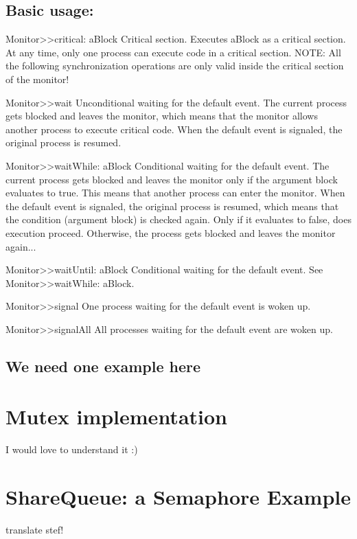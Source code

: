 \documentclass[10pt,twoside,english]{_support/latex/sbabook/sbabook}
\begin{document}
\section{Basic usage:}
Monitor\textgreater{}\textgreater{}critical: aBlock
Critical section.
Executes aBlock as a critical section. At any time, only one process can execute code in a critical section.
NOTE: All the following synchronization operations are only valid inside the critical section of the monitor!

Monitor\textgreater{}\textgreater{}wait
Unconditional waiting for the default event.
The current process gets blocked and leaves the monitor, which means that the monitor allows another process to execute critical code. When the default event is signaled, the original process is resumed.

Monitor\textgreater{}\textgreater{}waitWhile: aBlock
Conditional waiting for the default event.
The current process gets blocked and leaves the monitor only if the argument block evaluates to true. This means that another process can enter the monitor. When the default event is signaled, the original process is resumed, which means that the condition (argument block) is checked again. Only if it evaluates to false, does execution proceed. Otherwise, the process gets blocked and leaves the monitor again...

Monitor\textgreater{}\textgreater{}waitUntil: aBlock
Conditional waiting for the default event.
See Monitor\textgreater{}\textgreater{}waitWhile: aBlock.

Monitor\textgreater{}\textgreater{}signal
One process waiting for the default event is woken up.

Monitor\textgreater{}\textgreater{}signalAll
All processes waiting for the default event are woken up.
\section{We need one example here}\chapter{Mutex implementation}
I would love to understand it :)
\chapter{ShareQueue: a Semaphore Example}
\begin{todo}
translate stef! 
\end{todo}
\end{document}
